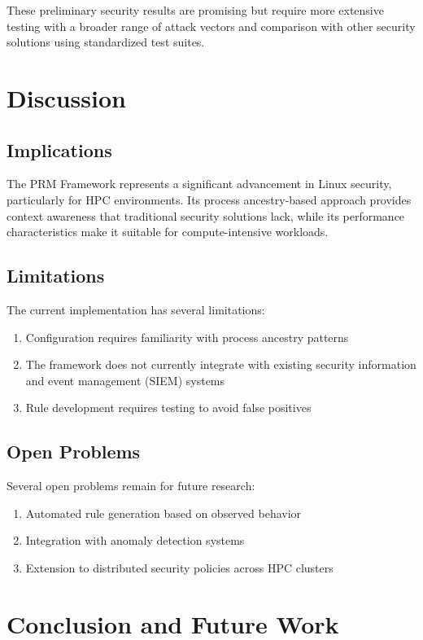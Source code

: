 These preliminary security results are promising but require more extensive testing with a broader range of attack vectors and comparison with other security solutions using standardized test suites.

\section{Discussion}
\label{sec:discussion}

\subsection{Implications}
The PRM Framework represents a significant advancement in Linux security, particularly for HPC environments. Its process ancestry-based approach provides context awareness that traditional security solutions lack, while its performance characteristics make it suitable for compute-intensive workloads.

\subsection{Limitations}
The current implementation has several limitations:

\begin{enumerate}
\item Configuration requires familiarity with process ancestry patterns
\item The framework does not currently integrate with existing security information and event management (SIEM) systems
\item Rule development requires testing to avoid false positives
\end{enumerate}

\subsection{Open Problems}
Several open problems remain for future research:

\begin{enumerate}
\item Automated rule generation based on observed behavior
\item Integration with anomaly detection systems
\item Extension to distributed security policies across HPC clusters
\end{enumerate}

\section{Conclusion and Future Work}
\label{sec:conclusion}

